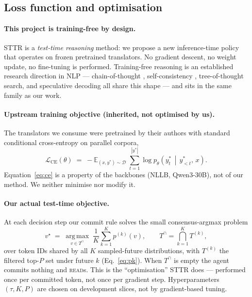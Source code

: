\documentclass{article}
\begin{document}
\subsection{Loss function and optimisation}
\label{sec:loss}

\paragraph{\boldmath This project is training-free by design.}
STTR is a \emph{test-time reasoning} method: we propose a new inference-time policy that operates
on frozen pretrained translators. No gradient descent, no weight update, no fine-tuning is
performed. Training-free reasoning is an established research direction in NLP --- chain-of-thought
\citep{wei2022cot}, self-consistency \citep{wang2022selfconsistency}, tree-of-thought search, and
speculative decoding all share this shape --- and sits in the same family as our work.

\paragraph{Upstream training objective (inherited, not optimised by us).}
The translators we consume were pretrained by their authors with standard conditional
cross-entropy on parallel corpora,
\begin{equation}
  \mathcal{L}_{\text{CE}}(\theta) \;=\; - \mathbb{E}_{(x,y^*)\sim \mathcal{D}}\;
  \sum_{t=1}^{|y^*|} \log p_\theta\!\left(y^*_t \,\middle|\, y^*_{<t},\,x\right).
  \label{eq:ce}
\end{equation}
Equation~\ref{eq:ce} is a property of the backbones (NLLB, Qwen3-30B), not of our method. We
neither minimise nor modify it.

\paragraph{Our actual test-time objective.}
At each decision step our commit rule solves the small consensus-argmax problem
\begin{equation}
  v^{\star} \;=\; \operatorname*{arg\,max}_{v \in T^{\cap}}\;
  \frac{1}{K}\sum_{k=1}^{K} p^{(k)}(v),
  \qquad T^{\cap} = \bigcap_{k=1}^{K} T^{(k)},
  \label{eq:testobj}
\end{equation}
over token IDs shared by all $K$ sampled-future distributions, with $T^{(k)}$ the filtered top-$P$
set under future $k$ (Eq.~\ref{eq:pk}). When $T^{\cap}$ is empty the agent commits nothing and
\textsc{read}s. This is the ``optimisation'' STTR does --- performed once per committed token,
not once per gradient step. Hyperparameters $(\tau, K, P)$ are chosen on development slices, not
by gradient-based tuning.
\end{document}
